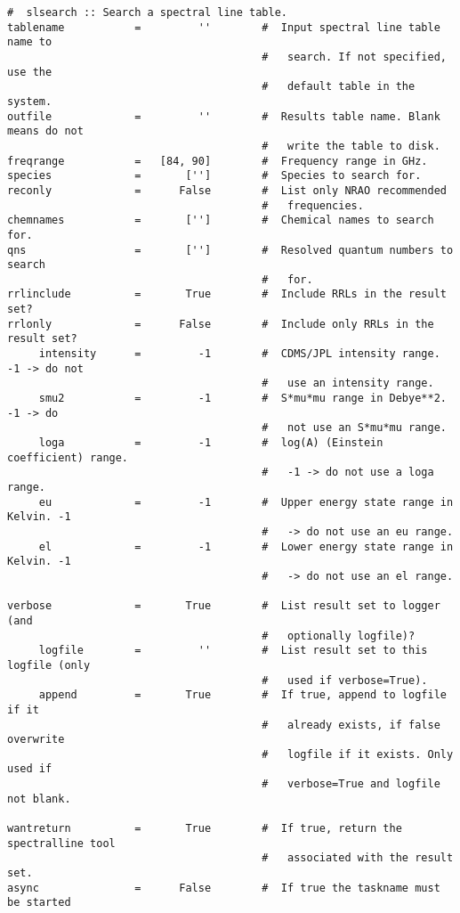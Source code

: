 \small
\begin{verbatim}
#  slsearch :: Search a spectral line table.
tablename           =         ''        #  Input spectral line table name to
                                        #   search. If not specified, use the
                                        #   default table in the system.
outfile             =         ''        #  Results table name. Blank means do not
                                        #   write the table to disk.
freqrange           =   [84, 90]        #  Frequency range in GHz.
species             =       ['']        #  Species to search for.
reconly             =      False        #  List only NRAO recommended
                                        #   frequencies.
chemnames           =       ['']        #  Chemical names to search for.
qns                 =       ['']        #  Resolved quantum numbers to search
                                        #   for.
rrlinclude          =       True        #  Include RRLs in the result set?
rrlonly             =      False        #  Include only RRLs in the result set?
     intensity      =         -1        #  CDMS/JPL intensity range. -1 -> do not
                                        #   use an intensity range.
     smu2           =         -1        #  S*mu*mu range in Debye**2. -1 -> do
                                        #   not use an S*mu*mu range.
     loga           =         -1        #  log(A) (Einstein coefficient) range.
                                        #   -1 -> do not use a loga range.
     eu             =         -1        #  Upper energy state range in Kelvin. -1
                                        #   -> do not use an eu range.
     el             =         -1        #  Lower energy state range in Kelvin. -1
                                        #   -> do not use an el range.

verbose             =       True        #  List result set to logger (and
                                        #   optionally logfile)?
     logfile        =         ''        #  List result set to this logfile (only
                                        #   used if verbose=True).
     append         =       True        #  If true, append to logfile if it
                                        #   already exists, if false overwrite
                                        #   logfile if it exists. Only used if
                                        #   verbose=True and logfile not blank.

wantreturn          =       True        #  If true, return the spectralline tool
                                        #   associated with the result set.
async               =      False        #  If true the taskname must be started
    
\end{verbatim}
\normalsize

